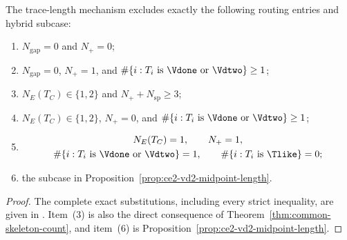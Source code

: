 \begin{proposition}
\label{prop:length-branches}
The trace-length mechanism excludes exactly the following routing entries
and hybrid subcase:
\begin{enumerate}
\item $N_{\mathrm{gap}}=0$ and $N_+=0$;
\item $N_{\mathrm{gap}}=0$, $N_+=1$, and
      $\#\{i:T_i\text{ is }\Vdone\text{ or }\Vdtwo\}\ge1$;
\item $N_E(T_C)\in\{1,2\}$ and $N_++N_{\mathrm{sp}}\ge3$;
\item $N_E(T_C)\in\{1,2\}$, $N_+=0$, and
      $\#\{i:T_i\text{ is }\Vdone\text{ or }\Vdtwo\}\ge1$;
\item
      \[
       \begin{gathered}
       N_E(T_C)=1,\qquad N_+=1,\\
       \#\{i:T_i\text{ is }\Vdone\text{ or }\Vdtwo\}=1,\qquad
       \#\{i:T_i\text{ is }\Tlike\}=0;
       \end{gathered}
      \]
\item the subcase in Proposition~\ref{prop:ce2-vd2-midpoint-length}.
\end{enumerate}
\end{proposition}

\begin{proof}
The complete exact substitutions, including every strict inequality, are
given in .  Item~(3) is also the
direct consequence of Theorem~\ref{thm:common-skeleton-count}, and item~(6)
is Proposition~\ref{prop:ce2-vd2-midpoint-length}.
\end{proof}
